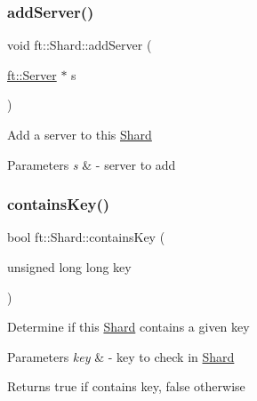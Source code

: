 \subsubsection{\texorpdfstring{add\+Server()}{addServer()}}
{\footnotesize\ttfamily void ft\+::\+Shard\+::add\+Server (\begin{DoxyParamCaption}\item[{\mbox{\hyperlink{classft_1_1Server}{ft\+::\+Server}} $\ast$}]{s }\end{DoxyParamCaption})\hspace{0.3cm}{\ttfamily [inline]}}

Add a server to this \mbox{\hyperlink{classft_1_1Shard}{Shard}}


\begin{DoxyParams}{Parameters}
{\em s} & -\/ server to add \\
\hline
\end{DoxyParams}
\mbox{\label{classft_1_1Shard_a42e25665d6fc9d6075d0477e3470c293}} 
\subsubsection{\texorpdfstring{contains\+Key()}{containsKey()}}
{\footnotesize\ttfamily bool ft\+::\+Shard\+::contains\+Key (\begin{DoxyParamCaption}\item[{unsigned long long}]{key }\end{DoxyParamCaption})\hspace{0.3cm}{\ttfamily [inline]}}

Determine if this \mbox{\hyperlink{classft_1_1Shard}{Shard}} contains a given key


\begin{DoxyParams}{Parameters}
{\em key} & -\/ key to check in \mbox{\hyperlink{classft_1_1Shard}{Shard}}\\
\hline
\end{DoxyParams}
\begin{DoxyReturn}{Returns}
true if contains key, false otherwise 
\end{DoxyReturn}
\mbox{\label{classft_1_1Shard_accde84c93a127987f75dccc9c57275b5}} 
